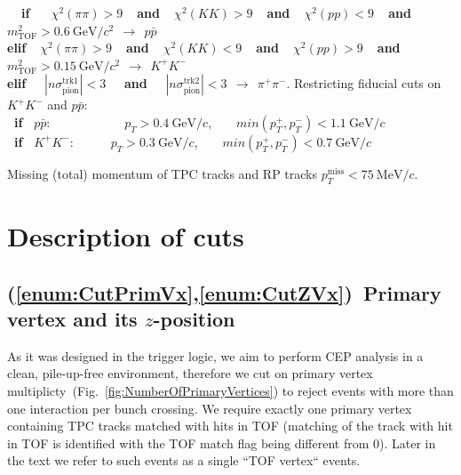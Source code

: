 \begin{enumerate}[label=\textbf{C\arabic*},ref=C\arabic*]
\begin{enumerate}[label=\textbf{\theenumi.\arabic*},ref=\theenumi.\arabic*]
        \textbf{~~if~~~}\hspace*{4.5pt}$\chi^{2}(\pi\pi)>9$\textbf{~~and~~}$\chi^{2}(KK)>9$\textbf{~~and~~}$\chi^{2}(pp)<9$\textbf{~~and~~}$m^{2}_{\text{TOF}}>0.6~\text{GeV}/c^{2}~~\rightarrow~~p\bar{p}$\\[5pt]%
        \textbf{elif~~}$\chi^{2}(\pi\pi)>9$\textbf{~~and~~}$\chi^{2}(KK)<9$\textbf{~~and~~}$\chi^{2}(pp)>9$\textbf{~~and~~}$m^{2}_{\text{TOF}}>0.15~\text{GeV}/c^{2}~~\rightarrow~~K^{+}K^{-}$\\[5pt]%
        \textbf{elif~~} $|n\sigma_{\text{pion}}^{\text{trk1}}|<3$ \textbf{~~and~~} $|n\sigma_{\text{pion}}^{\text{trk2}}|<3~~\rightarrow~~\pi^{+}\pi^{-}$.%
      \itemm Restricting fiducial cuts on $K^{+}K^{-}$ and $p\bar{p}$:\label{enum:CutPidPtLimits}\\[2pt]
      \textbf{~if~} $p\bar{p}$:~~~~~~~~~~~~\hspace*{1.7pt}$p_{T}>0.4~\text{GeV}/c$,~~~~$min(p_{T}^{+},p_{T}^{-})<1.1~\text{GeV}/c$\\%
      \textbf{~if~} $K^{+}K^{-}$:~~~~~~$p_{T}>0.3~\text{GeV}/c$,~~~~$min(p_{T}^{+},p_{T}^{-})<0.7~\text{GeV}/c$%
\end{enumerate}
\itemm Missing (total) momentum of TPC tracks and RP tracks $p_{T}^{\text{miss}}<75~\text{MeV}/c$.\label{enum:CutMissingPt}%
 
\end{enumerate}

\section{Description of cuts}\label{sec:descriptionOfCuts}
\subsection{(\ref{enum:CutPrimVx},\ref{enum:CutZVx})~Primary vertex and its \texorpdfstring{$z$}{z}-position}
As it was designed in the trigger logic, we aim to perform CEP analysis in a clean, pile-up-free environment, therefore we cut on primary vertex multiplicty~(Fig.~\ref{fig:NumberOfPrimaryVertices}) to reject events with more than one interaction per bunch crossing. We require exactly one primary vertex containing TPC tracks matched with hits in TOF (matching of the track with hit in TOF is identified with the TOF match flag being different from 0). Later in the text we refer to such events as a single ``TOF vertex`` events.

